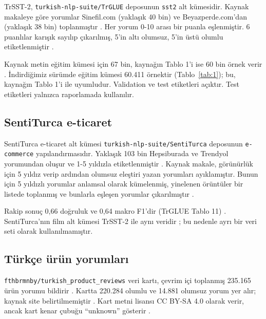 \documentclass[11pt]{article}
\begin{document}
TrSST-2, \texttt{turkish-{}\allowbreak{}nlp-{}\allowbreak{}suite/\allowbreak{}\allowbreak{}TrGLUE} deposunun \texttt{sst2} alt kümesidir. Kaynak makaleye göre yorumlar Sinefil.com (yaklaşık 40 bin) ve Beyazperde.com'dan (yaklaşık 38 bin) toplanmıştır \citep{altinok2025}. Her yorum 0-10 arası bir puanla eşlenmiştir. 6 puanlılar karışık sayılıp çıkarılmış, 5'in altı olumsuz, 5'in üstü olumlu etiketlenmiştir \citep{altinok2025}.

Kaynak metin eğitim kümesi için 67 bin, kaynağın Tablo 1'i ise 60 bin örnek verir \citep{altinok2025}. İndirdiğimiz sürümde eğitim kümesi 60.411 örnektir (Tablo~\ref{tab:1}); bu, kaynağın Tablo 1'i ile uyumludur. Validation ve test etiketleri açıktır. Test etiketleri yalnızca raporlamada kullanılır.

\subsection{SentiTurca e-ticaret}

SentiTurca e-ticaret alt kümesi \texttt{turkish-{}\allowbreak{}nlp-{}\allowbreak{}suite/\allowbreak{}\allowbreak{}SentiTurca} deposunun \texttt{e-{}\allowbreak{}commerce} yapılandırmasıdır. Yaklaşık 103 bin Hepsiburada ve Trendyol yorumundan oluşur ve 1-5 yıldızla etiketlenmiştir \citep{altinok2025}. Kaynak makale, görünürlük için 5 yıldız verip ardından olumsuz eleştiri yazan yorumları ayıklamıştır. Bunun için 5 yıldızlı yorumlar anlamsal olarak kümelenmiş, yinelenen örüntüler bir listede toplanmış ve bunlarla eşleşen yorumlar çıkarılmıştır \citep{altinok2025}.

Rakip sonuç 0,66 doğruluk ve 0,64 makro F1'dir (TrGLUE Tablo 11) \citep{altinok2025}. SentiTurca'nın film alt kümesi TrSST-2 ile aynı veridir \citep{altinok2025}; bu nedenle ayrı bir veri seti olarak kullanılmamıştır.

\subsection{Türkçe ürün yorumları}

\texttt{fthbrmnby/\allowbreak{}\allowbreak{}turkish\_\allowbreak{}\allowbreak{}product\_\allowbreak{}\allowbreak{}reviews} veri kartı, çevrim içi toplanmış 235.165 ürün yorumu bildirir \citep{turkishproductreviews}. Kartta 220.284 olumlu ve 14.881 olumsuz yorum yer alır; kaynak site belirtilmemiştir \citep{turkishproductreviews}. Kart metni lisansı CC BY-SA 4.0 olarak verir, ancak kart kenar çubuğu ``unknown'' gösterir \citep{turkishproductreviews}.
\end{document}

